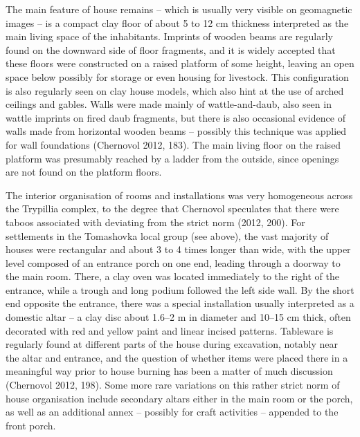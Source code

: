 \documentclass[
  12pt,
  a4paper, twoside]{book}
\begin{document}
The main feature of house remains -- which is usually very visible on geomagnetic images -- is a compact clay floor of about 5 to 12 cm thickness interpreted as the main living space of the inhabitants. Imprints of wooden beams are regularly found on the downward side of floor fragments, and it is widely accepted that these floors were constructed on a raised platform of some height, leaving an open space below possibly for storage or even housing for livestock. This configuration is also regularly seen on clay house models, which also hint at the use of arched ceilings and gables. Walls were made mainly of wattle-and-daub, also seen in wattle imprints on fired daub fragments, but there is also occasional evidence of walls made from horizontal wooden beams -- possibly this technique was applied for wall foundations (Chernovol 2012, 183). The main living floor on the raised platform was presumably reached by a ladder from the outside, since openings are not found on the platform floors.

The interior organisation of rooms and installations was very homogeneous across the Trypillia complex, to the degree that Chernovol speculates that there were taboos associated with deviating from the strict norm (2012, 200). For settlements in the Tomashovka local group (see above), the vast majority of houses were rectangular and about 3 to 4 times longer than wide, with the upper level composed of an entrance porch on one end, leading through a doorway to the main room. There, a clay oven was located immediately to the right of the entrance, while a trough and long podium followed the left side wall. By the short end opposite the entrance, there was a special installation usually interpreted as a domestic altar -- a clay disc about 1.6--2 m in diameter and 10--15 cm thick, often decorated with red and yellow paint and linear incised patterns. Tableware is regularly found at different parts of the house during excavation, notably near the altar and entrance, and the question of whether items were placed there in a meaningful way prior to house burning has been a matter of much discussion (Chernovol 2012, 198). Some more rare variations on this rather strict norm of house organisation include secondary altars either in the main room or the porch, as well as an additional annex -- possibly for craft activities -- appended to the front porch.
\end{document}
